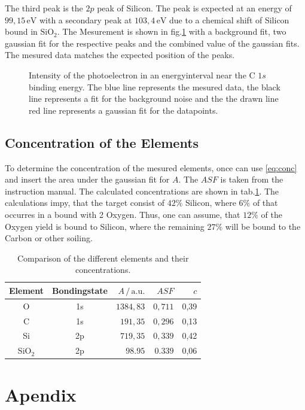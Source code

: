 \documentclass[numbers=noenddot,a4paper]{article}
\begin{document}
	The third peak is the $2p$ peak of Silicon. The peak is expected at an energy of $99,15\,\mathrm{eV}$ with a secondary peak at $103,4\,\mathrm{eV}$ due to a chemical shift of Silicon bound in $\text{SiO}_2$. The Mesurement is shown in fig.\ref{fig:Si2p} with a background fit, two gaussian fit for the respective peaks and the combined value of the gaussian fits. The mesured data matches the expected position of the peaks.
	
	\begin{figure}[!H]
		\centering
		\caption{Intensity of the photoelectron in an energyinterval near the C $1s$ binding energy. The blue line represents the mesured data, the black line represents a fit for the background noise and the  the drawn line red line represents a gaussian fit for the datapoints.}
		\label{fig:Si2p}
	\end{figure}
	
	
	
	\subsection{Concentration of the Elements}
	
	To determine the concentration of the mesured elements, once can use \eqref{eq:conc} and insert the area under the gaussian fit for $A$. The $ASF$ is taken from the instruction manual. The calculated concentrations are shown in tab.\ref{tab:conc}. The calculations impy, that the target consist of $42\%$ Silicon, where $6\%$ of that occurres in a bound with 2 Oxygen. Thus, one can assume, that $12\%$ of the Oxygen yield is bound to Silicon, where the remaining $27\%$ will be bound to the Carbon or other soiling.
	
	\begin{table}[h]
		\centering
		\caption{Comparison of the different elements and their concentrations.}
		\begin{tabular}{c c r r r}
			\hline Element & Bondingstate & $A\,/\,\mathrm{a.u.}$ & $ASF$ & $c$ \\ \hline \hline
			O & 1s & $1384,83$ & $0,711$ & 0,39 \\ 
			C & 1s & $191,35$ & $0,296$ & 0,13 \\ 
			Si & 2p & $719,35$ & $0,339$ & 0,42 \\ 
			SiO$_2$ & 2p & $98.95$ & $0.339$ & 0,06 \\ \hline
		\end{tabular}
		\label{tab:conc}
	\end{table}
	
	\clearpage
	\section{Apendix}
	
	
	
	
\end{document}
